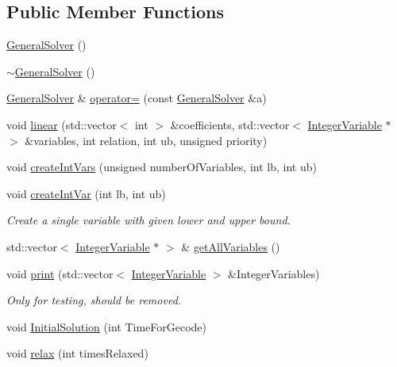 \subsection*{Public Member Functions}
\begin{DoxyCompactItemize}
\item 
\hyperlink{class_general_solver_af6a162313c6ca4252b3fb09335e44add}{General\-Solver} ()
\item 
\hyperlink{class_general_solver_adca6fe5293d5216c11b82313a6684c44}{$\sim$\-General\-Solver} ()
\item 
\hyperlink{class_general_solver}{General\-Solver} \& \hyperlink{class_general_solver_a39fa8b0891ddd2a84d07e08e781c560a}{operator=} (const \hyperlink{class_general_solver}{General\-Solver} \&a)
\item 
void \hyperlink{class_general_solver_aa431b9e98724dde0d6c6cbe850f9e801}{linear} (std\-::vector$<$ int $>$ \&coefficients, std\-::vector$<$ \hyperlink{class_integer_variable}{Integer\-Variable} $\ast$ $>$ \&variables, int relation, int ub, unsigned priority)
\item 
void \hyperlink{class_general_solver_a11f08371a72b67b40e72822ac15bfd69}{create\-Int\-Vars} (unsigned number\-Of\-Variables, int lb, int ub)
\item 
void \hyperlink{class_general_solver_a0aef6a5662ed6cc2b87a04959221c0e4}{create\-Int\-Var} (int lb, int ub)
\begin{DoxyCompactList}\small\item\em Create a single variable with given lower and upper bound. \end{DoxyCompactList}\item 
std\-::vector$<$ \hyperlink{class_integer_variable}{Integer\-Variable} $\ast$ $>$ \& \hyperlink{class_general_solver_a0ca7cec1b92600361e1b7d4aeefa4d20}{get\-All\-Variables} ()
\item 
void \hyperlink{class_general_solver_a35a41c86b56b652bb8c6b7b96a4e8713}{print} (std\-::vector$<$ \hyperlink{class_integer_variable}{Integer\-Variable} $>$ \&Integer\-Variables)
\begin{DoxyCompactList}\small\item\em Only for testing, should be removed. \end{DoxyCompactList}\item 
void \hyperlink{class_general_solver_a8da2ce27fc096edaee250ea3ed068072}{Initial\-Solution} (int Time\-For\-Gecode)
\item 
void \hyperlink{class_general_solver_a3ab6827d7643be316d88e689845b86ec}{relax} (int times\-Relaxed)

\end{DoxyCompactItemize}
